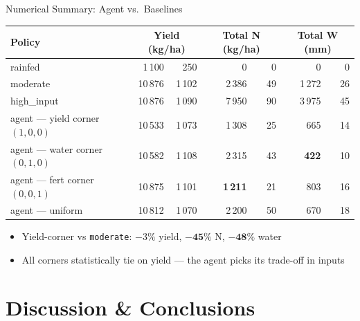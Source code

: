 \documentclass[10pt,aspectratio=169]{beamer}
\begin{document}
\begin{frame}{Numerical Summary: Agent vs.\ Baselines}
  \centering
  \scriptsize
  \begin{tabular}{l r@{\,$\pm$\,}r r@{\,$\pm$\,}r r@{\,$\pm$\,}r}
    \toprule
    \textbf{Policy} & \multicolumn{2}{c}{\textbf{Yield (kg/ha)}} &
                       \multicolumn{2}{c}{\textbf{Total N (kg/ha)}} &
                       \multicolumn{2}{c}{\textbf{Total W (mm)}} \\
    \midrule
    rainfed                        & 1\,100 & 250 & 0     & 0  & 0     & 0   \\
    moderate                       & 10\,876 & 1\,102 & 2\,386 & 49 & 1\,272 & 26 \\
    high\_input                    & 10\,876 & 1\,090 & 7\,950 & 90 & 3\,975 & 45 \\
    \midrule
    \textcolor{cYield}{agent — yield corner $(1,0,0)$} & 10\,533 & 1\,073 & 1\,308 & 25 & 665 & 14 \\
    \textcolor{cWater}{agent — water corner $(0,1,0)$} & 10\,582 & 1\,108 & 2\,315 & 43 & \textbf{422} & 10 \\
    \textcolor{cFert}{agent — fert  corner $(0,0,1)$}  & 10\,875 & 1\,101 & \textbf{1\,211} & 21 & 803 & 16 \\
    agent — uniform                & 10\,812 & 1\,070 & 2\,200 & 50 & 670 & 18 \\
    \bottomrule
  \end{tabular}

  \vspace{0.7em}
  \footnotesize
  \begin{itemize}
    \item Yield-corner vs \texttt{moderate}: $-3\%$ yield, $\boldsymbol{-45\%}$ N, $\boldsymbol{-48\%}$ water
    \item All corners statistically tie on yield --- the agent picks its trade-off in inputs
  \end{itemize}
\end{frame}

\section{Discussion \& Conclusions}
\end{document}
